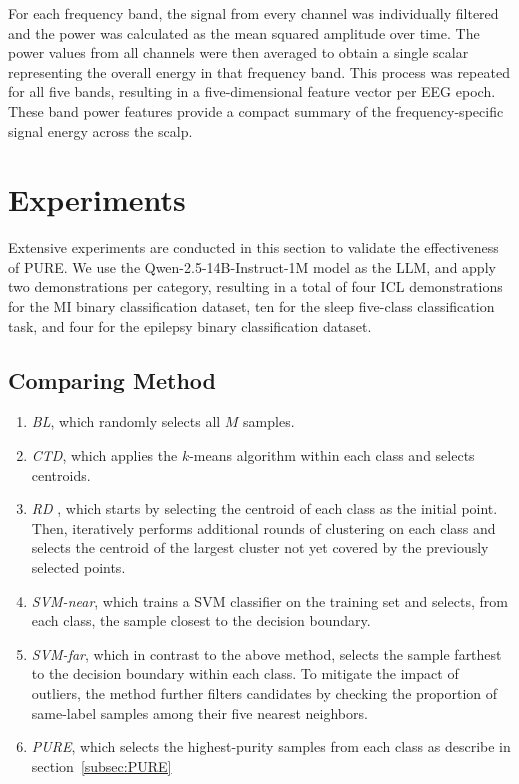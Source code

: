 \documentclass[journal,twocolumn]{IEEEtran}
\begin{document}
For each frequency band, the signal from every channel was individually filtered and the power was calculated as the mean squared amplitude over time. The power values from all channels were then averaged to obtain a single scalar representing the overall energy in that frequency band. This process was repeated for all five bands, resulting in a five-dimensional feature vector per EEG epoch. These band power features provide a compact summary of the frequency-specific signal energy across the scalp.

\section{Experiments}
\label{sec:exp}

Extensive experiments are conducted in this section to validate the effectiveness of PURE. We use the Qwen-2.5-14B-Instruct-1M model as the LLM, and apply two demonstrations per category, resulting in a total of four ICL demonstrations for the MI binary classification dataset, ten for the sleep five-class classification task, and four for the epilepsy binary classification dataset.

\subsection{Comparing Method}
\begin{enumerate}
\item \emph{BL}, which randomly selects all $M$ samples.
\item \emph{CTD}, which applies the $k$-means algorithm within each class and selects centroids.
\item \emph{RD} \cite{wu2018pool}, which starts by selecting the centroid of each class as the initial point. Then, iteratively performs additional rounds of clustering on each class and selects the centroid of the largest cluster not yet covered by the previously selected points.
\item \emph{SVM-near}, which trains a SVM classifier on the training set and selects, from each class, the sample closest to the decision boundary.
\item \emph{SVM-far}, which in contrast to the above method, selects the sample farthest to the decision boundary within each class. To mitigate the impact of outliers, the method further filters candidates by checking the proportion of same-label samples among their five nearest neighbors.
\item \emph{PURE}, which selects the highest-purity samples from each class as describe in section~\ref{subsec:PURE}
\end{enumerate}
\end{document}
